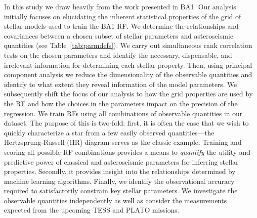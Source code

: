 In this study we draw heavily from the work presented in BA1.
Our analysis initially focuses on elucidating the inherent statistical properties of the grid of stellar models used to train the BA1 RF. 
We determine the relationships and covariances between a chosen subset of stellar parameters and asteroseismic quantities (see Table~\ref{tab:parmdefs}). 
We carry out simultaneous rank correlation tests on the chosen parameters and identify the necessary, dispensable, and irrelevant information for determining each stellar property.
Then, using principal component analysis %
we reduce the dimensionality of the observable quantities and identify to what extent they reveal information of the model parameters.
We subsequently shift the focus of our analysis to how the grid properties are used by the RF and how the choices in the parameters impact on the precision of the regression. 
We train RFs using all combinations of observable quantities in our dataset. The purpose of this is two-fold: first, it is often the case that we wish to quickly characterize a star from a few easily observed quantities---the Hertzsprung-Russell (HR) diagram serves as the classic example. Training and scoring all possible RF combinations provides a means to \emph{quantify} the utility and predictive power of classical and asteroseismic parameters for inferring stellar properties. Secondly, it provides insight into the relationships determined by machine learning algorithms. 
Finally, we identify the observational accuracy required to satisfactorily constrain key stellar parameters. We investigate the observable quantities independently as well as consider the measurements expected from the upcoming TESS and PLATO missions.


